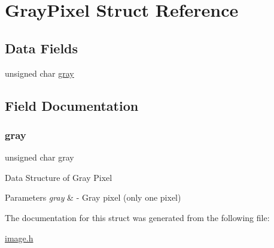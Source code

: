 \hypertarget{struct_gray_pixel}{}\section{Gray\+Pixel Struct Reference}
\label{struct_gray_pixel}
\subsection*{Data Fields}
\begin{DoxyCompactItemize}
\item 
unsigned char \hyperlink{struct_gray_pixel_ac68d828f52924f4a78b09a57bb3016a3}{gray}
\end{DoxyCompactItemize}


\subsection{Field Documentation}
\mbox{\label{struct_gray_pixel_ac68d828f52924f4a78b09a57bb3016a3}} 
\subsubsection{\texorpdfstring{gray}{gray}}
{\footnotesize\ttfamily unsigned char gray}

Data Structure of Gray Pixel 
\begin{DoxyParams}{Parameters}
{\em gray} & -\/ Gray pixel (only one pixel) \\
\hline
\end{DoxyParams}


The documentation for this struct was generated from the following file\+:\begin{DoxyCompactItemize}
\item 
\hyperlink{image_8h}{image.\+h}\end{DoxyCompactItemize}
